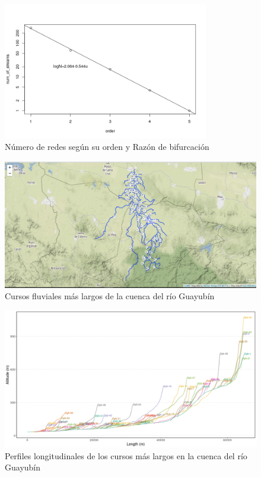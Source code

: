 \documentclass[11pt,]{article}
\begin{document}
\begin{figure}
\centering
\includegraphics[width=0.80000\textwidth]{Numero de red segun su orden.png}
\caption{Número de redes según su orden y Razón de
bifurcación\label{grafnumero}}
\end{figure}

\begin{figure}
\centering
\includegraphics[width=1.00000\textwidth]{cursos mas largos.png}
\caption{Cursos fluviales más largos de la cuenca del río
Guayubín\label{lfpnet}}
\end{figure}

\begin{figure}
\centering
\includegraphics[width=1.00000\textwidth]{perfiles longitudinales.png}
\caption{Perfiles longitudinales de los cursos más largos en la cuenca
del río Guayubín\label{plongitudinal}}
\end{figure}
\end{document}
